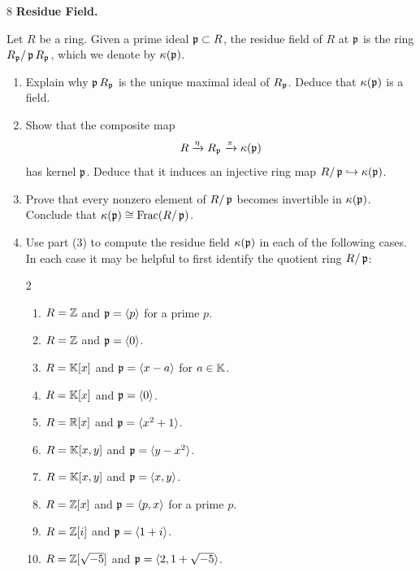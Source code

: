 \documentclass[Notebook.tex]{subfiles}
\begin{document}
\begin{problem}{8}
    \textbf{Residue Field.} 
    
    Let $R$ be a ring. Given a prime ideal $\operatorname{\mathfrak{p}} \subset R$, the residue field of $R$ at $\operatorname{\mathfrak{p}}$ is the ring $R_{\operatorname{\mathfrak{p}}}/\operatorname{\mathfrak{p}} R_{\operatorname{\mathfrak{p}}}$, which we denote by $\kappa(\operatorname{\mathfrak{p}})$. 
    \begin{enumerate}
        \item Explain why $\operatorname{\mathfrak{p}} R_{\operatorname{\mathfrak{p}}}$ is the unique maximal ideal of $R_{\operatorname{\mathfrak{p}}}$. Deduce that $\kappa(\operatorname{\mathfrak{p}})$ is a field.
        
        \item Show that the composite map
        \[
        R\xrightarrow{\eta} R_{\operatorname{\mathfrak{p}}}\xrightarrow{\pi} \kappa(\operatorname{\mathfrak{p}})
        \]
        has kernel $\operatorname{\mathfrak{p}}$. Deduce that it induces an injective ring map $R/\operatorname{\mathfrak{p}} \hookrightarrow \kappa(\operatorname{\mathfrak{p}})$.

        \item Prove that every nonzero element of $R/\operatorname{\mathfrak{p}}$ becomes invertible in $\kappa(\operatorname{\mathfrak{p}})$. Conclude that $\kappa(\operatorname{\mathfrak{p}})\cong \text{Frac}(R/\operatorname{\mathfrak{p}})$.

        \item Use part (3) to compute the residue field $\kappa(\operatorname{\mathfrak{p}})$ in each of the following cases. In each case it may be helpful to first identify the quotient ring $R/\operatorname{\mathfrak{p}}$:
        \begin{multicols}{2}
        \begin{enumerate}
            \item $R=\mathbb Z$ and $\operatorname{\mathfrak{p}}=\langle p\rangle$ for a prime $p$.
            \item $R=\mathbb Z$ and $\operatorname{\mathfrak{p}}=\langle 0\rangle$.
            \item $R=\mathbb K[x]$ and $\operatorname{\mathfrak{p}}=\langle x-a\rangle$ for $a\in \mathbb K$.
            \item $R=\mathbb K[x]$ and $\operatorname{\mathfrak{p}}=\langle 0\rangle$.
            \item $R=\mathbb R[x]$ and $\operatorname{\mathfrak{p}}=\langle x^2+1\rangle$.
            \item $R=\mathbb K[x,y]$ and $\operatorname{\mathfrak{p}}=\langle y-x^2\rangle$.
            \item $R=\mathbb K[x,y]$ and $\operatorname{\mathfrak{p}}=\langle x,y\rangle$.
            \item $R=\mathbb Z[x]$ and $\operatorname{\mathfrak{p}}=\langle p,x\rangle$ for a prime $p$.
            \item $R=\mathbb Z[i]$ and $\operatorname{\mathfrak{p}}=\langle 1+i\rangle$.
            \item $R=\mathbb Z[\sqrt{-5}]$ and $\operatorname{\mathfrak{p}}=\langle 2,1+\sqrt{-5}\rangle$.
        \end{enumerate}
        \end{multicols}
    \end{enumerate}
\end{problem}
\end{document}
